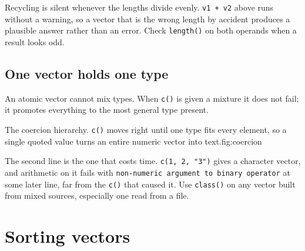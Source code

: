 \begin{pitfall}
Recycling is silent whenever the lengths divide evenly. \texttt{v1 + v2} above
runs without a warning, so a vector that is the wrong length by accident
produces a plausible answer rather than an error. Check \texttt{length()} on
both operands when a result looks odd.
\end{pitfall}

\subsection{One vector holds one type}
An atomic vector cannot mix types. When \texttt{c()} is given a mixture it
does not fail; it promotes everything to the most general type present.

\begin{utpfig}[Coercion]{The coercion hierarchy. \texttt{c()} moves right until
one type fits every element, so a single quoted value turns an entire numeric
vector into text.}{fig:coercion}
\end{utpfig}

\begin{pitfall}
The second line is the one that costs time. \texttt{c(1, 2, "3")} gives a
character vector, and arithmetic on it fails with
\texttt{non-numeric argument to binary operator} at some later line, far from
the \texttt{c()} that caused it. Use \texttt{class()} on any vector built from
mixed sources, especially one read from a file.
\end{pitfall}

\section{Sorting vectors}

